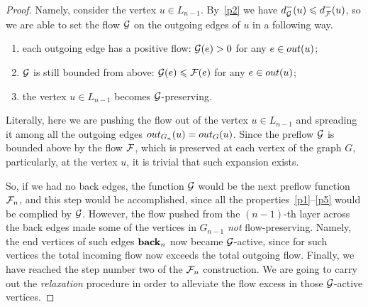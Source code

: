 \documentclass[12pt]{amsart}
\begin{document}
\begin{proof}
        Namely, consider the vertex $u \in L_{n-1}$.
        By~\ref{p2} we have $d_{\cal{G}}^{-}(u) \leq d_{\flowpos}^{-}(u)$,
          so we are able to set the flow $\cal{G}$ on the outgoing edges of $u$ in a following way.
        \begin{enumerate}[label=\textbf{(\roman*)}]
          \item\label{posprop} each outgoing edge has a positive flow: $\cal{G}(e) > 0$ for any $e \in \eout(u)$;
          \item $\cal{G}$ is still bounded from above: $\cal{G}(e) \leq \flowpos(e)$ for any $e \in \eout(u)$;
          \item the vertex $u \in L_{n-1}$ becomes $\cal{G}$-preserving.
        \end{enumerate}
        \begin{remark}
          Literally, here we are pushing the flow out of the vertex $u \in L_{n-1}$ and spreading it among all the outgoing edges
            $\eout_{G_n}(u) = \eout_G(u)$.
          Since the preflow $\cal{G}$ is bounded above by the flow $\flowpos$, which is preserved at each vertex of the graph $G$,
            particularly, at the vertex $u$, it is trivial that such expansion exists.
        \end{remark}
        So, if we had no back edges, the function $\cal{G}$ would be the next preflow function $\flowposn{n}$, and this step would be accomplished,
          since all the properties~\ref{p1}--\ref{p5} would be complied by $\cal{G}$.
        However, the flow pushed from the $(n-1)$-th layer across the back edges made some of the vertices in $G_{n-1}$ \emph{not} flow-preserving.
        Namely, the end vertices of such edges $\eback_{n}$ now became $\cal{G}$-active, since for such vertices
          the total incoming flow now exceeds the total outgoing flow.
        Finally, we have reached the step number two of the $\flowposn{n}$ construction.
        We are going to carry out the \emph{relaxation} procedure in order to alleviate the flow excess in those $\cal{G}$-active vertices.


\end{proof}
\end{document}
